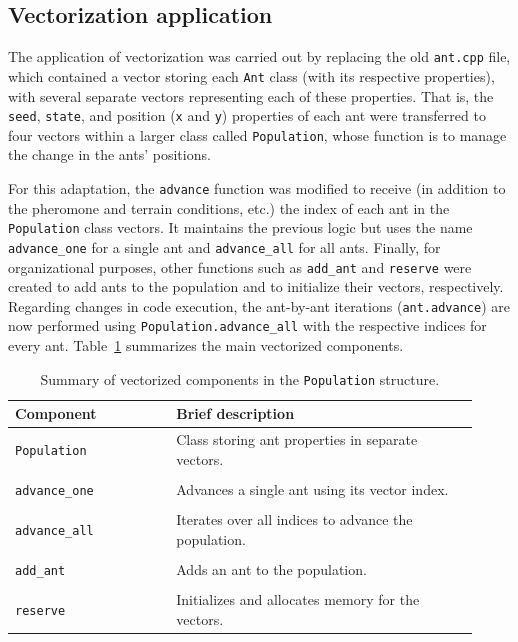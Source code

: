 \subsection{Vectorization application}
The application of vectorization was carried out by replacing the old \texttt{ant.cpp} file, which contained a vector storing each \texttt{Ant} class (with its respective properties), with several separate vectors representing each of these properties.
That is, the \texttt{seed}, \texttt{state}, and position (\texttt{x} and \texttt{y}) properties of each ant were transferred to four vectors within a larger class called \texttt{Population}, whose function is to manage the change in the ants' positions.

For this adaptation, the \texttt{advance} function was modified to receive (in addition to the pheromone and terrain conditions, etc.) the index of each ant in the \texttt{Population} class vectors. It maintains the previous logic but uses the name \texttt{advance\_one} for a single ant and \texttt{advance\_all} for all ants.
Finally, for organizational purposes, other functions such as \texttt{add\_ant} and \texttt{reserve} were created to add ants to the population and to initialize their vectors, respectively.
Regarding changes in code execution, the ant-by-ant iterations (\texttt{ant.advance}) are now performed using \texttt{Population.advance\_all} with the respective indices for every ant. Table~\ref{tab:vectorization_summary} summarizes the main vectorized components.

\begin{table}[htbp]
\centering
\caption{Summary of vectorized components in the \texttt{Population} structure.}
\label{tab:vectorization_summary}
\small
\begin{tabular}{p{0.32\linewidth} p{0.60\linewidth}}
\hline
\textbf{Component} & \textbf{Brief description} \\
\hline
\texttt{Population} & Class storing ant properties in separate vectors. \\
\shortstack[l]{\texttt{Population::}\\\texttt{advance\_one}} & Advances a single ant using its vector index. \\
\shortstack[l]{\texttt{Population::}\\\texttt{advance\_all}} & Iterates over all indices to advance the population. \\
\shortstack[l]{\texttt{Population::}\\\texttt{add\_ant}} & Adds an ant to the population. \\
\shortstack[l]{\texttt{Population::}\\\texttt{reserve}} & Initializes and allocates memory for the vectors. \\
\hline
\end{tabular}
\end{table}

